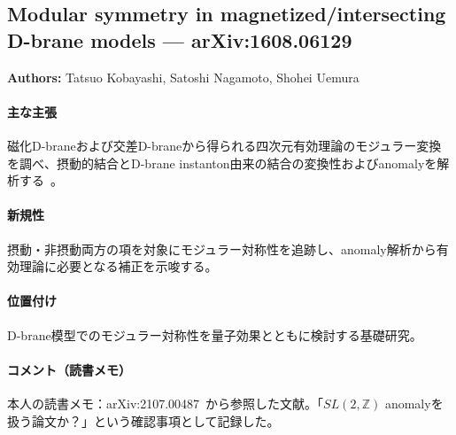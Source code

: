 \subsection{Modular symmetry in magnetized/intersecting D-brane models --- arXiv:1608.06129}

\textbf{Authors:} Tatsuo Kobayashi, Satoshi Nagamoto, Shohei Uemura

\paragraph{主な主張}
磁化D-braneおよび交差D-braneから得られる四次元有効理論のモジュラー変換を調べ、摂動的結合とD-brane instanton由来の結合の変換性およびanomalyを解析する~\cite{Kobayashi:2016ovu}。

\paragraph{新規性}
摂動・非摂動両方の項を対象にモジュラー対称性を追跡し、anomaly解析から有効理論に必要となる補正を示唆する。

\paragraph{位置付け}
D-brane模型でのモジュラー対称性を量子効果とともに検討する基礎研究。

\paragraph{コメント（読書メモ）}
本人の読書メモ：arXiv:2107.00487~\cite{Ishiguro:2021ccl}から参照した文献。「$SL(2,\mathbb{Z})$ anomalyを扱う論文か？」という確認事項として記録した。
